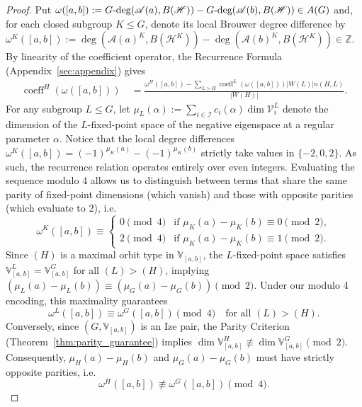 \documentclass[twoside]{article}%
\def\bz{{\mathbb{Z}}}
\def\gdeg{G\text{\rm -deg}}
\begin{document}
\begin{proof}
Put $\omega([a,b]) := \gdeg(\mathscr A(a), B(\mathscr H)) - \gdeg(\mathscr A(b), B(\mathscr H)) \in A(G)$ and, for each closed subgroup $K \leq G$, denote its local Brouwer degree difference by $\omega^K([a,b]) := \deg(\mathscr A(a)^K, B(\mathscr H^K)) - \deg(\mathscr A(b)^K, B(\mathscr H^K)) \in \bz$. 
By linearity of the coefficient operator, the Recurrence Formula (Appendix~\ref{sec:appendix}) gives
\begin{align*}
\operatorname{coeff}^H ( \omega([a,b]) )  \quad = \frac{\omega^H([a,b]) - \sum_{L > H} \operatorname{coeff}^L ( \omega([a,b]) ) |W(L)| n(H,L)}{|W(H)|}.
\end{align*}
For any subgroup $L \leq G$, let $\mu_L(\alpha) := \sum_{i \in \mathcal I} c_{i}(\alpha) \dim \mathcal V_{i}^L$ denote the dimension of the $L$-fixed-point space of the negative eigenspace at a regular parameter $\alpha$.
Notice that the local degree differences $\omega^K([a,b]) = (-1)^{\mu_K(a)} - (-1)^{\mu_K(b)}$ strictly take values in $\{-2, 0, 2\}$. As such, the recurrence relation operates entirely over even integers. Evaluating the sequence modulo 4 allows us to distinguish between terms that share the same parity of fixed-point dimensions (which vanish) and those with opposite parities (which evaluate to $2$), i.e.
\[
    \omega^K([a,b]) \equiv \begin{cases} 
        0 \pmod 4 & \text{if } \mu_K(a) - \mu_K(b) \equiv 0 \pmod 2, \\
        2 \pmod 4 & \text{if } \mu_K(a) - \mu_K(b) \equiv 1 \pmod 2.
    \end{cases}
\]
Since $(H)$ is a maximal orbit type in $\mathbb V_{[a,b]}$, the $L$-fixed-point space satisfies $\mathbb V_{[a,b]}^L = \mathbb V_{[a,b]}^G$ for all $(L) > (H)$, implying $(\mu_L(a) - \mu_L(b)) \equiv (\mu_G(a) - \mu_G(b)) \pmod{2}$. Under our modulo 4 encoding, this maximality guarantees
\begin{equation}\label{eq:parity_lock_1}
    \omega^L([a,b]) \equiv \omega^G([a,b]) \pmod 4 \quad \text{for all } (L) > (H).
\end{equation}
Conversely, since $(G, \mathbb V_{[a,b]})$ is an Ize pair, the Parity Criterion (Theorem~\ref{thm:parity_guarantee}) implies $\dim \mathbb V_{[a,b]}^H \not\equiv \dim \mathbb V_{[a,b]}^G \pmod 2$. Consequently, $\mu_H(a) - \mu_H(b)$ and $\mu_G(a) - \mu_G(b)$ must have strictly opposite parities, i.e.
\begin{equation}\label{eq:parity_lock_2}
    \omega^H([a,b]) \not\equiv \omega^G([a,b]) \pmod 4.

\end{equation}
\end{proof}
\end{document}
